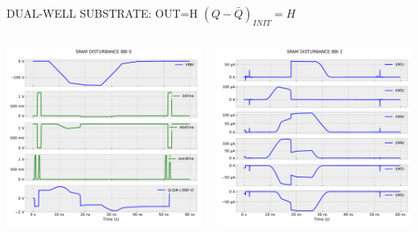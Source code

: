 
\begin{frame}{DUAL-WELL SUBSTRATE: OUT=H}
	\vspace{5mm}
	$(Q-\bar{Q})_{INIT}=H$
	\vspace{5mm}
	\begin{columns}
		\begin{column}{0.5\textwidth}
			\centering
			\includegraphics[width=\textwidth]{./figures/SRAMBBI0-300DW.pdf}
		\end{column}
		\begin{column}{0.5\textwidth}
			\centering
			\includegraphics[width=\textwidth]{./figures/SRAMBBI2-300DW.pdf}
		\end{column}
	\end{columns}
\end{frame}
